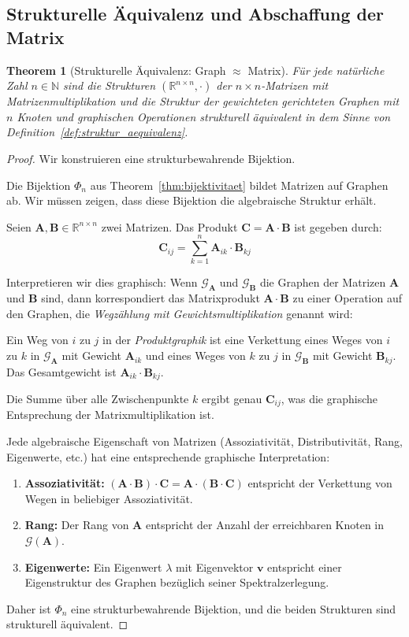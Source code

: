 \documentclass[12pt, a4paper]{article}
\newtheorem{theorem}{Theorem}[section]
\theoremstyle{definition}
\theoremstyle{remark}
\newcommand{\R}{\mathbb{R}}
\newcommand{\N}{\mathbb{N}}
\newcommand{\vA}{\bm{A}}
\newcommand{\vB}{\bm{B}}
\newcommand{\vC}{\bm{C}}
\newcommand{\Graph}{\mathcal{G}}
\begin{document}
\subsection{Strukturelle Äquivalenz und Abschaffung der Matrix}
\label{subsec:strukturelle_aequivalenz}

\begin{theorem}[Strukturelle Äquivalenz: Graph $\approx$ Matrix]
\label{thm:strukturelle_aequivalenz}
Für jede natürliche Zahl $n \in \N$ sind die Strukturen $(\R^{n \times n}, \cdot)$ der $n \times n$-Matrizen mit Matrizenmultiplikation und die Struktur der gewichteten gerichteten Graphen mit $n$ Knoten und graphischen Operationen strukturell äquivalent in dem Sinne von Definition~\ref{def:struktur_aequivalenz}.
\end{theorem}

\begin{proof}
Wir konstruieren eine strukturbewahrende Bijektion.

Die Bijektion $\Phi_n$ aus Theorem~\ref{thm:bijektivitaet} bildet Matrizen auf Graphen ab. Wir müssen zeigen, dass diese Bijektion die algebraische Struktur erhält.

Seien $\vA, \vB \in \R^{n \times n}$ zwei Matrizen. Das Produkt $\vC = \vA \cdot \vB$ ist gegeben durch:
\[
  \vC_{ij} = \sum_{k=1}^{n} \vA_{ik} \cdot \vB_{kj}
\]

Interpretieren wir dies graphisch: Wenn $\Graph_{\vA}$ und $\Graph_{\vB}$ die Graphen der Matrizen $\vA$ und $\vB$ sind, dann korrespondiert das Matrixprodukt $\vA \cdot \vB$ zu einer Operation auf den Graphen, die \emph{Wegzählung mit Gewichtsmultiplikation} genannt wird:

Ein Weg von $i$ zu $j$ in der \emph{Produktgraphik} ist eine Verkettung eines Weges von $i$ zu $k$ in $\Graph_{\vA}$ mit Gewicht $\vA_{ik}$ und eines Weges von $k$ zu $j$ in $\Graph_{\vB}$ mit Gewicht $\vB_{kj}$. Das Gesamtgewicht ist $\vA_{ik} \cdot \vB_{kj}$.

Die Summe über alle Zwischenpunkte $k$ ergibt genau $\vC_{ij}$, was die graphische Entsprechung der Matrixmultiplikation ist.

Jede algebraische Eigenschaft von Matrizen (Assoziativität, Distributivität, Rang, Eigenwerte, etc.) hat eine entsprechende graphische Interpretation:
\begin{enumerate}[label=(\alph*)]
  \item \textbf{Assoziativität:} $(\vA \cdot \vB) \cdot \vC = \vA \cdot (\vB \cdot \vC)$ entspricht der Verkettung von Wegen in beliebiger Assoziativität.
  \item \textbf{Rang:} Der Rang von $\vA$ entspricht der Anzahl der erreichbaren Knoten in $\Graph(\vA)$.
  \item \textbf{Eigenwerte:} Ein Eigenwert $\lambda$ mit Eigenvektor $\mathbf{v}$ entspricht einer Eigenstruktur des Graphen bezüglich seiner Spektralzerlegung.
\end{enumerate}

Daher ist $\Phi_n$ eine strukturbewahrende Bijektion, und die beiden Strukturen sind strukturell äquivalent.
\end{proof}
\end{document}
